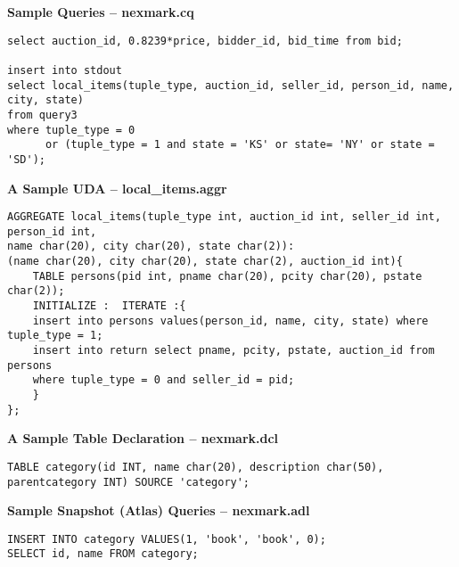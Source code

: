 \documentclass[10pt]{article}
\begin{document}
\vspace{1cm}
{\bf Sample Queries -- nexmark.cq}
\begin{verbatim}
select auction_id, 0.8239*price, bidder_id, bid_time from bid;

insert into stdout
select local_items(tuple_type, auction_id, seller_id, person_id, name, city, state) 
from query3 
where tuple_type = 0 
      or (tuple_type = 1 and state = 'KS' or state= 'NY' or state = 'SD');
\end{verbatim}
\vspace{1cm}
{\bf A Sample UDA -- local\_items.aggr}
\begin{verbatim}
AGGREGATE local_items(tuple_type int, auction_id int, seller_id int, person_id int, 
name char(20), city char(20), state char(2)): 
(name char(20), city char(20), state char(2), auction_id int){
    TABLE persons(pid int, pname char(20), pcity char(20), pstate char(2));
    INITIALIZE :  ITERATE :{
	insert into persons values(person_id, name, city, state) where tuple_type = 1;
	insert into return select pname, pcity, pstate, auction_id from persons 
	where tuple_type = 0 and seller_id = pid;
    }
};

\end{verbatim}
\vspace{1cm}
{\bf A Sample Table Declaration -- nexmark.dcl}
\begin{verbatim}
TABLE category(id INT, name char(20), description char(50), parentcategory INT) SOURCE 'category';
\end{verbatim}


\vspace{1cm}
{\bf Sample Snapshot (Atlas) Queries -- nexmark.adl}
\begin{verbatim}
INSERT INTO category VALUES(1, 'book', 'book', 0);
SELECT id, name FROM category;
\end{verbatim}
\end{document}
